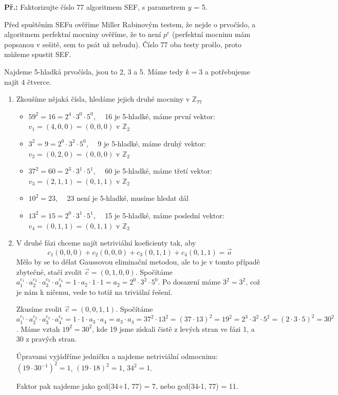\documentclass[10pt,a4paper]{article}
\begin{document}
\begin{exercise}
\textbf{Př.:} Faktorizujte číslo 77 algoritmem SEF, s parametrem $y$ = 5.

Před spuštěním SEFu ověříme Miller Rabinovým testem, že nejde o prvočíslo, a
algoritmem perfektní mocniny ověříme, že to není $p^e$ (perfektní mocninu mám
popsanou v sešitě, sem to psát už nebudu). Číslo 77 oba testy prošlo, proto
můžeme spustit SEF.

Najdeme 5-hladká prvočísla, jsou to 2, 3 a 5. Máme tedy $k = 3$ a potřebujeme
najít 4 čtverce.

\begin{enumerate}
\item Zkoušíme nějaká čísla, hledáme jejich druhé mocniny v $\mathbb{Z}_{77}$
\begin{itemize}
\item $59^2 = 16 = 2^4 \cdot 3^0 \cdot 5^0$, ~~16 je 5-hladké, máme první
vektor: $v_1 = (4, 0, 0) = (0, 0, 0)$ v $\mathbb{Z}_2$
\item $3^2 = 9 = 2^0 \cdot 3^2 \cdot 5^0$, ~~9 je 5-hladké, máme druhý vektor:
$v_2 = (0, 2, 0) = (0, 0, 0)$ v $\mathbb{Z}_2$
\item $37^2 = 60 = 2^3 \cdot 3^1 \cdot 5^1$, ~~60 je 5-hladké, máme třetí
vektor: $v_3 = (2, 1, 1) = (0, 1, 1)$ v $\mathbb{Z}_2$
\item $10^2 = 23$, ~~23 není je 5-hladké, musíme hledat dál
\item $13^2 = 15 = 2^0 \cdot 3^1 \cdot 5^1$, ~~15 je 5-hladké, máme poslední
vektor: $v_4 = (0, 1, 1) = (0, 1, 1)$ v $\mathbb{Z}_2$
\end{itemize}
\item V druhé fázi chceme najít netriviální koeficienty tak, aby
$$c_1(0, 0, 0) + c_2(0, 0, 0) + c_3(0, 1, 1) + c_4(0, 1, 1) = \vec{o}$$ Mělo by
se to dělat Gaussovou eliminační metodou, ale to je v tomto případě zbytečné,
stačí zvolit $\vec{c} = (0, 1, 0, 0)$. Spočítáme $a_1^{c_1} \cdot a_2^{c_2}
\cdot a_3^{c_3} \cdot a_4^{c_4} = 1 \cdot a_2 \cdot 1 \cdot 1 = a_2 = 2^0 \cdot
3^2 \cdot 5^0$. Po dosazení máme $3^2 = 3^2$, což je nám k ničemu, vede to totiž
na triviální řešení.

Zkusíme zvolit  $\vec{c} = (0, 0, 1, 1)$. Spočítáme $a_1^{c_1} \cdot a_2^{c_2}
\cdot a_3^{c_3} \cdot a_4^{c_4} =  1 \cdot 1 \cdot a_3 \cdot a_4 = a_3 \cdot a_4
= 37^2 \cdot 13^2 = (37 \cdot 13)^2 = 19^2 =  2^3 \cdot 3^2 \cdot 5^2 = (2\cdot
3 \cdot 5)^2 = 30^2$. Máme vztah $19^2 = 30^2$, kde 19 jsme získali čistě z
levých stran ve fázi 1, a 30 z pravých stran.

Úpravami vyjádříme jedničku a najdeme netriviální odmocninu: $(19 \cdot
30^{-1})^2 = 1$, $(19 \cdot 18)^2 = 1$, $34^2 = 1$.

Faktor pak najdeme jako gcd(34+1, 77) = 7, nebo gcd(34-1, 77) = 11.
\end{enumerate}
\end{exercise}
\end{document}

